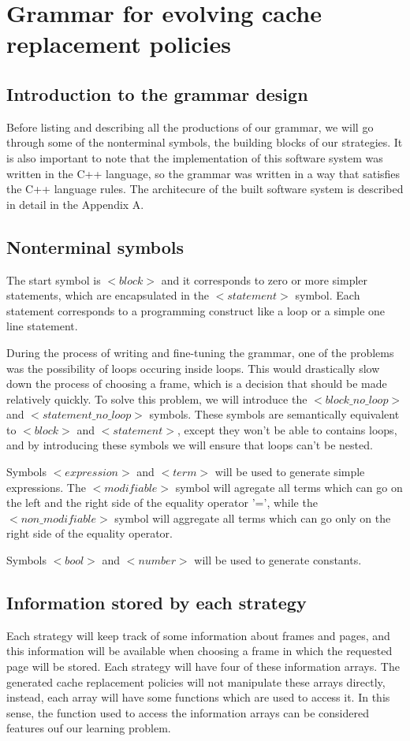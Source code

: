 \section{Grammar for evolving cache replacement policies}
\subsection{Introduction to the grammar design}
Before listing and describing all the productions of our grammar, we will go through some of the nonterminal symbols, the building blocks of our strategies. It is also important to note that the implementation of this software system was written in the C++ language, so the grammar was written in a way that satisfies the C++ language rules. The architecure of the built software system is described in detail in the Appendix A.

\subsection{Nonterminal symbols}
The start symbol is ${<}block{>}$ and it corresponds to zero or more simpler statements, which are encapsulated in the ${<}statement{>}$ symbol. Each statement corresponds to a programming construct like a loop or a simple one line statement.

During the process of writing and fine-tuning the grammar, one of the problems was the possibility of loops occuring inside loops. This would drastically slow down the process of choosing a frame, which is a decision that should be made relatively quickly. To solve this problem, we will introduce the ${<}block\_no\_loop{>}$ and ${<}statement\_no\_loop{>}$ symbols. These symbols are semantically equivalent to ${<}block{>}$ and ${<}statement{>}$, except they won't be able to contains loops, and by introducing these symbols we will ensure that loops can't be nested.

Symbols ${<}expression{>}$ and ${<}term{>}$ will be used to generate simple expressions. The ${<}modifiable{>}$ symbol	 will agregate all terms which can go on the left and the right side of the equality operator '=', while the ${<}non\_modifiable{>}$ symbol will aggregate all terms which can go only on the right side of the equality operator.

Symbols ${<}bool{>}$ and ${<}number{>}$ will be used to generate constants.

\subsection{Information stored by each strategy}
Each strategy will keep track of some information about frames and pages, and this information will be available when choosing a frame in which the requested page will be stored. Each strategy will have four of these information arrays. The generated cache replacement policies will not manipulate these arrays directly, instead, each array will have some functions which are used to access it. In this sense, the function used to access the information arrays can be considered features ouf our learning problem.


